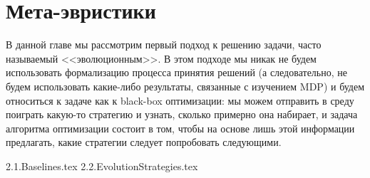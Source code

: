 \documentclass[../main.tex]{subfiles}
\begin{document}
\chapter{Мета-эвристики}\label{metaheuristicchapter}

В данной главе мы рассмотрим первый подход к решению задачи, часто называемый <<эволюционным>>. В этом подходе мы никак не будем использовать формализацию процесса принятия решений (а следовательно, не будем использовать какие-либо результаты, связанные с изучением MDP) и будем относиться к задаче как к black-box оптимизации: мы можем отправить в среду поиграть какую-то стратегию и узнать, сколько примерно она набирает, и задача алгоритма оптимизации состоит в том, чтобы на основе лишь этой информации предлагать, какие стратегии следует попробовать следующими. 

{2.1.Baselines.tex}
{2.2.EvolutionStrategies.tex}
\end{document}
